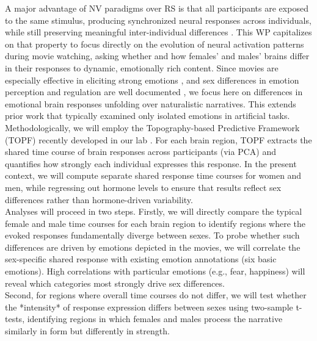 \documentclass[11pt,a4paper]{article}
\begin{document}
A major advantage of NV paradigms over RS is that all participants are exposed to the same stimulus, 
producing synchronized neural responses across individuals, while still preserving meaningful inter-individual 
differences \parencite{finnIdiosynchronySharedResponses2020a,vanderwalIndividualDifferencesFunctional2017}. 
This WP capitalizes on that property to focus directly on the evolution of neural activation patterns 
during movie watching, asking whether and how females' and males' brains differ in their responses 
to dynamic, emotionally rich content. Since movies are especially effective in eliciting 
strong emotions \parencite{grossEmotionElicitationUsing1995,westermannRelativeEffectivenessValidity1996}, 
and sex differences in emotion perception and regulation are well documented 
\parencite{domesNeuralCorrelatesSex2010a,gardenerSexDifferencesEmotion2013a}, 
we focus here on differences in emotional brain responses unfolding over naturalistic narratives. 
This extends prior work that typically examined only isolated emotions in artificial tasks.\\  
Methodologically, we will employ the Topography-based Predictive Framework (TOPF) recently 
developed in our lab \parencite{liTopographybasedPredictiveFramework2023a}. For each brain region, 
TOPF extracts the shared time course of brain responses across participants (via PCA) and quantifies how 
strongly each individual expresses this response. In the present context, we will compute separate 
shared response time courses for women and men, while regressing out hormone levels to ensure that 
results reflect sex differences rather than hormone-driven variability.\\ 
Analyses will proceed in two steps. Firstly, we will directly compare the typical female and male time courses 
for each brain region to identify regions where the evoked responses fundamentally diverge between sexes. 
To probe whether such differences are driven by emotions depicted in the movies, we will correlate the 
sex-specific shared response with existing emotion annotations (six basic emotions). 
High correlations with particular emotions (e.g., fear, happiness) will reveal which 
categories most strongly drive sex differences.\\
Second, for regions where overall time courses do not differ, we will test whether the *intensity* of 
response expression differs between sexes using two-sample t-tests, identifying regions in which 
females and males process the narrative similarly in form but differently in strength. 
\end{document}
